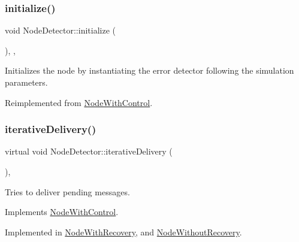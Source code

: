 \mbox{\label{class_node_detector_aefa188ab0657837b1b57f24674d3ef22}} 
\subsubsection{\texorpdfstring{initialize()}{initialize()}}
{\footnotesize\ttfamily void Node\+Detector\+::initialize (\begin{DoxyParamCaption}{ }\end{DoxyParamCaption})\hspace{0.3cm}{\ttfamily [override]}, {\ttfamily [protected]}, {\ttfamily [virtual]}}



Initializes the node by instantiating the error detector following the simulation parameters. 



Reimplemented from \hyperlink{class_node_with_control_a08c8e80fd67b52c51c642d7c66fe729c}{Node\+With\+Control}.

\mbox{\label{class_node_detector_a17ecf9939fce7471f4513b66185743cc}} 
\subsubsection{\texorpdfstring{iterative\+Delivery()}{iterativeDelivery()}}
{\footnotesize\ttfamily virtual void Node\+Detector\+::iterative\+Delivery (\begin{DoxyParamCaption}{ }\end{DoxyParamCaption})\hspace{0.3cm}{\ttfamily [protected]}, {}}



Tries to deliver pending messages. 



Implements \hyperlink{class_node_with_control_a4f78078272b90937e0746c797443b37d}{Node\+With\+Control}.



Implemented in \hyperlink{class_node_with_recovery_a9b61912f38b62452584dc80bf261ef4e}{Node\+With\+Recovery}, and \hyperlink{class_node_without_recovery_a65e21db6d6b4e72b898fd567f8b4aee2}{Node\+Without\+Recovery}.

